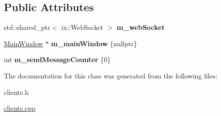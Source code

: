 \subsection*{Public Attributes}
\begin{DoxyCompactItemize}
\item 
\mbox{\label{classCliente_a070eee41426cc6777ba68ccc05032363}} 
std\+::shared\+\_\+ptr$<$ ix\+::\+Web\+Socket $>$ {\bfseries m\+\_\+web\+Socket}
\item 
\mbox{\label{classCliente_aaad98d44708ace05fc5c35c918f0e428}} 
\mbox{\hyperlink{classMainWindow}{Main\+Window}} $\ast$ {\bfseries m\+\_\+main\+Window} \{nullptr\}
\item 
\mbox{\label{classCliente_a97957afa9d66e9a3221f67e0d965d199}} 
int {\bfseries m\+\_\+send\+Message\+Counter} \{0\}
\end{DoxyCompactItemize}


The documentation for this class was generated from the following files\+:\begin{DoxyCompactItemize}
\item 
cliente.\+h\item 
\mbox{\hyperlink{cliente_8cpp}{cliente.\+cpp}}\end{DoxyCompactItemize}
